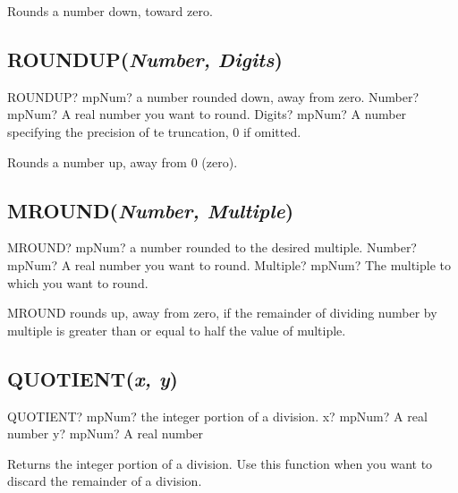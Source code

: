 \vspace{0.3cm}
Rounds a number down, toward zero.





\subsection{ROUNDUP(\textit{Number, Digits})}

\begin{mpFunctionsExtract}
	\mpWorksheetFunctionTwoNotImplemented
	{ROUNDUP? mpNum? a number rounded down, away from zero.}
	{Number? mpNum? A real number you want to round.}
	{Digits? mpNum? A number specifying the precision of te truncation, 0 if omitted.}
\end{mpFunctionsExtract}

\vspace{0.3cm}
Rounds a number up, away from 0 (zero).




\subsection{MROUND(\textit{Number, Multiple})}

\begin{mpFunctionsExtract}
	\mpWorksheetFunctionTwoNotImplemented
	{MROUND? mpNum? a number rounded to the desired multiple.}
	{Number? mpNum? A real number you want to round.}
	{Multiple? mpNum? The multiple to which you want to round.}
\end{mpFunctionsExtract}

\vspace{0.3cm}
MROUND rounds up, away from zero, if the remainder of dividing number by multiple is greater than or equal to half the value of multiple.




\subsection{QUOTIENT(\textit{x, y})}

\begin{mpFunctionsExtract}
	\mpWorksheetFunctionTwoNotImplemented
	{QUOTIENT? mpNum? the integer portion of a division.}
	{x? mpNum? A real number}
	{y? mpNum? A real number}
\end{mpFunctionsExtract}


\vspace{0.3cm}
Returns the integer portion of a division. Use this function when you want to discard the remainder of a division.






